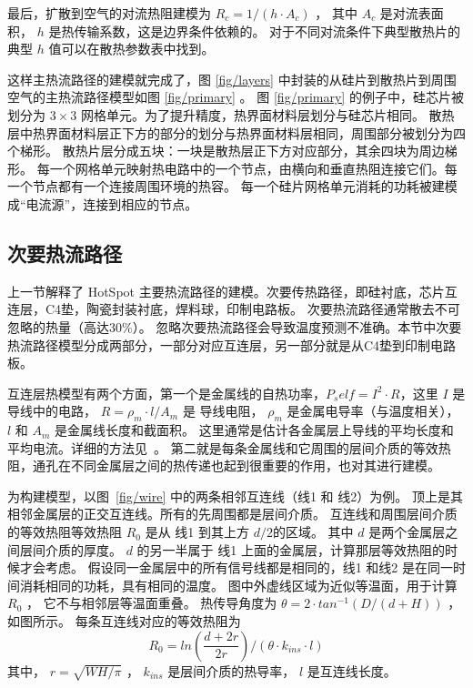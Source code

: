 最后，扩散到空气的对流热阻建模为 $R_c = 1/(h\cdot A_c)$ ， 其中 $A_c$ 是对流表面积， $h$ 是热传输系数，这是边界条件依赖的。
对于不同对流条件下典型散热片的典型 $h$ 值可以在散热参数表中找到。

这样主热流路径的建模就完成了，图 \ref{fig/layers} 中封装的从硅片到散热片到周围空气的主热流路径模型如图 \ref{fig/primary} 。 
图 \ref{fig/primary} 的例子中，硅芯片被划分为 $3 \times 3$ 网格单元。为了提升精度，热界面材料层划分与硅芯片相同。
散热层中热界面材料层正下方的部分的划分与热界面材料层相同，周围部分被划分为四个梯形。
散热片层分成五块：一块是散热层正下方对应部分，其余四块为周边梯形。
每一个网格单元映射热电路中的一个节点，由横向和垂直热阻连接它们。每一个节点都有一个连接周围环境的热容。
每一个硅片网格单元消耗的功耗被建模成“电流源”，连接到相应的节点。

\subsection{次要热流路径}\label{sec:secondary}

上一节解释了 HotSpot 主要热流路径的建模。次要传热路径，即硅衬底，芯片互连层，C4垫，陶瓷封装衬底，焊料球，印制电路板。
次要热流路径通常散去不可忽略的热量（高达$30\%$）。
忽略次要热流路径会导致温度预测不准确。本节中次要热流路径模型分成两部分，一部分对应互连层，另一部分就是从C4垫到印制电路板。

互连层热模型有两个方面，第一个是金属线的自热功率，$P_self = I^2\cdot R$，这里 $I$ 是导线中的电路，
$R = \rho_m \cdot l/A_m$ 是 导线电阻， $\rho_m$ 是金属电导率（与温度相关）， $l$ 和 $A_m$ 是金属线长度和截面积。
这里通常是估计各金属层上导线的平均长度和平均电流。详细的方法见~\cite{huang2004compact}。
第二就是每条金属线和它周围的层间介质的等效热阻，通孔在不同金属层之间的热传递也起到很重要的作用，也对其进行建模。

为构建模型，以图~\ref{fig/wire} 中的两条相邻互连线（线1 和 线2）为例。
顶上是其相邻金属层的正交互连线。所有的先周围都是层间介质。
互连线和周围层间介质的等效热阻等效热阻 $R_0$ 是从 线1 到其上方 $d/2$的区域。
其中 $d$ 是两个金属层之间层间介质的厚度。
$d$ 的另一半属于 线1 上面的金属层，计算那层等效热阻的时候才会考虑。
假设同一金属层中的所有信号线都是相同的，线1 和线2 是在同一时间消耗相同的功耗，具有相同的温度。
图中外虚线区域为近似等温面，用于计算 $R_0$ ， 它不与相邻层等温面重叠。
热传导角度为 $\theta = 2 \cdot tan^{-1}(D/(d+H))$ ，如图所示。
每条互连线对应的等效热阻为
\begin{equation}\label{eq:R0}
R_0 = ln(\frac{d+2r}{2r})/(\theta \cdot k_{ins} \cdot l)
\end{equation}
其中， $r = \sqrt{WH/\pi}$ ， $k_{ins}$ 是层间介质的热导率， $l$ 是互连线长度。

